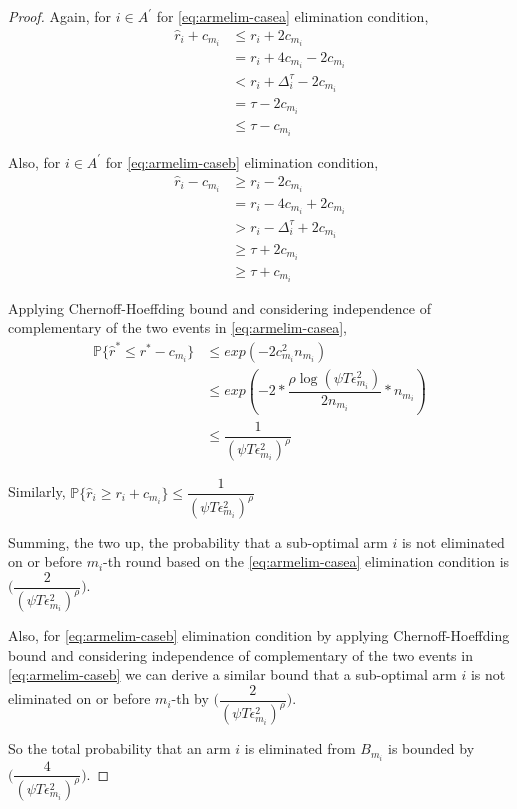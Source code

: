 \begin{proof}
Again, for ${i} \in A^{'}$ for \ref{eq:armelim-casea} elimination condition, 
\begin{align*}
\hat{r}_{i} + c_{m_{i}}&\leq r_{i} + 2c_{m_{i}} \\
&= r_{i} + 4c_{m_{i}} - 2c_{m_{i}} \\
&< r_{i} + \Delta_{i}^{\tau} - 2c_{m_{i}}\\
&= \tau -2c_{m_{i}} \\
&\leq \tau - c_{m_{i}}
\end{align*}

Also, for ${i} \in A^{'}$ for \ref{eq:armelim-caseb} elimination condition, 
\begin{align*}
\hat{r}_{i} - c_{m_{i}}&\geq r_{i} - 2c_{m_{i}} \\
&= r_{i} - 4c_{m_{i}} + 2c_{m_{i}} \\
&> r_{i} - \Delta_{i}^{\tau} + 2c_{m_{i}}\\
&\geq \tau + 2c_{m_{i}} \\
&\geq \tau + c_{m_{i}}
\end{align*}

Applying Chernoff-Hoeffding bound and considering independence of complementary of the two events in \ref{eq:armelim-casea},
  \begin{align*}
\mathbb{P}\lbrace\hat{r}^{*}\leq r^{*} - c_{m_{i}}\rbrace &\leq exp(-2c_{m_{i}}^{2}n_{m_{i}})\\
&\leq exp(-2 * \dfrac{\rho\log (\psi T\epsilon_{m_{i}}^{2})}{2 n_{m_{i}}} *n_{m_{i}})\\
&\leq \dfrac{1}{(\psi T\epsilon_{m_{i}}^{2})^{\rho}}   
  \end{align*}
  
Similarly, $\mathbb{P}\lbrace\hat{r}_{i}\geq r_{i} + c_{m_{i}}\rbrace\leq \dfrac{1}{(\psi  T\epsilon_{m_{i}}^{2})^{\rho}}$
 
Summing, the two up, the probability that a sub-optimal arm ${i}$ is not eliminated on or before $m_{i}$-th round based on the \ref{eq:armelim-casea} elimination condition is  $\bigg(\dfrac{2}{(\psi T\epsilon_{m_{i}}^{2})^{\rho}}\bigg)$. 

Also, for \ref{eq:armelim-caseb} elimination condition by applying Chernoff-Hoeffding bound and considering independence of complementary of the two events in \ref{eq:armelim-caseb} we can derive a similar bound that a sub-optimal arm ${i}$ is not eliminated on or before $m_{i}$-th by $\bigg(\dfrac{2}{(\psi T\epsilon_{m_{i}}^{2})^{\rho}}\bigg)$. 

So the total probability that an arm $i$ is eliminated from $B_{m_{i}}$ is bounded by $\bigg(\dfrac{4}{(\psi T\epsilon_{m_{i}}^{2})^{\rho}}\bigg)$. 


\end{proof}

